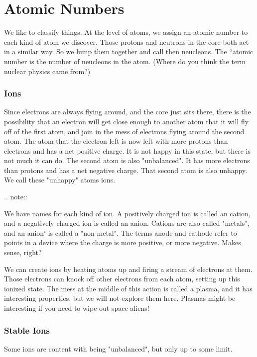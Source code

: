 \section{Atomic Numbers}

We like to classify things. At the level of atoms, we assign an atomic
number to each kind of atom we discover. Those protons and neutrons
in the core both act in a similar way. So we lump them together and call
then neucleons. The ``atomic number is the number of neucleons in the
atom. (Where do you think the term nuclear physics came from?)

\subsubsection{Ions}

Since electrons are always flying around, and the core just sits there,
there is the possibility that an electron will get close enough to another atom
that it will fly off of the first atom, and join in the mess of electrons
flying around the second atom. The atom that the electron left is now left
with more protons than electrons and has a net positive charge. It
is not happy in this state, but there is not much it can do. The second atom is
also "unbalanced". It has more electrons than protons and has a net
negative charge. That second atom is also unhappy. We call these "unhappy"
atoms ions. 

..  note::

    We have names for each kind of ion. A positively charged ion is
    called an cation, and a negatively charged ion is called an
    anion. Cations are also called "metals", and an anion` is called a
    "non-metal". The terms anode and cathode refer to points in a
    device where the charge is more positive, or more negative. Makes sense,
    right?


We can create ions by heating atoms up and firing a stream of electrons
at them. Those electrons can knock off other electrons from each atom, setting
up this ionized state. The mess at the middle of this action is called a
plasma, and it has interesting properties, but we will not explore them
here. Plasmas might be interesting if you need to wipe out space aliens!

\subsubsection{Stable Ions}

Some ions are content with being "unbalanced", but only up to some limit.

